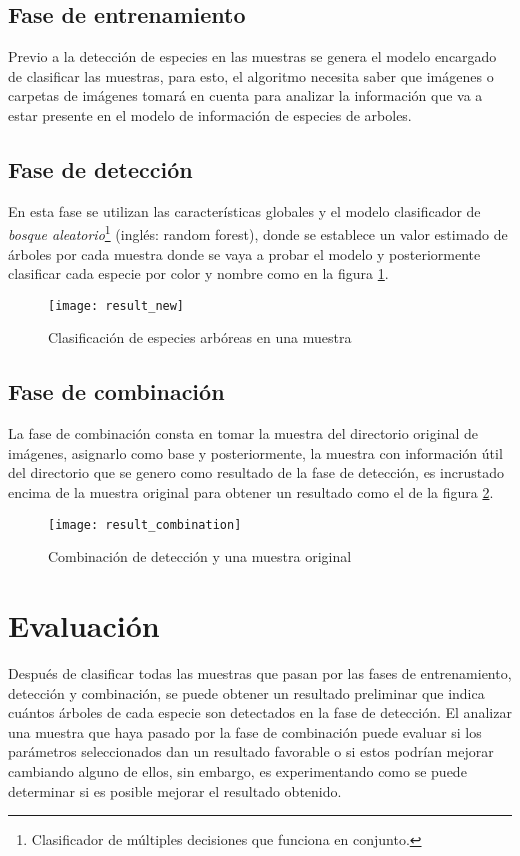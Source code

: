 \documentclass[review]{elsarticle}
\begin{document}
\subsection{Fase de entrenamiento}
Previo a la detección de especies en las muestras se genera el modelo encargado de clasificar las muestras, para esto, el algoritmo necesita saber que imágenes o carpetas de imágenes tomará en cuenta para analizar la información que va a estar presente en el modelo de información de especies de arboles. 

\subsection{Fase de detección}
En esta fase se utilizan las características globales y el modelo clasificador de {\em bosque aleatorio}\footnote{Clasificador de múltiples decisiones que funciona en conjunto.} (inglés: random forest), donde se establece un valor estimado de árboles por cada muestra donde se vaya a probar el modelo y posteriormente clasificar cada especie por color y nombre como en la figura \ref{Clasificación de especies arbóreas en una muestra}.
\\

\begin{figure}[H]
  \centering
         \texttt{[image: result\_new]}
    \caption{Clasificación de especies arbóreas en una muestra}
    \label{Clasificación de especies arbóreas en una muestra}
\end{figure}

\subsection{Fase de combinación}
La fase de combinación consta en tomar la muestra del directorio original de imágenes, asignarlo como base y posteriormente, la muestra con información útil del directorio que se genero como resultado de la fase de detección, es incrustado encima de la muestra original para obtener un resultado como el de la figura \ref{Combinación de detección y una muestra original}.


\begin{figure}[H]
  \centering
  \texttt{[image: result\_combination]}
    \caption{Combinación de detección y una muestra original}
    \label{Combinación de detección y una muestra original}
\end{figure}
\clearpage

\section{Evaluación}
Después de clasificar todas las muestras que pasan por las fases de entrenamiento, detección y combinación, se puede obtener un resultado preliminar que indica  cuántos árboles de cada especie son detectados en la fase de detección. El analizar una muestra que haya pasado por la fase de combinación puede evaluar si los parámetros seleccionados dan un resultado favorable o si estos podrían mejorar cambiando alguno de ellos, sin embargo, es experimentando como se puede determinar si es posible mejorar el resultado obtenido.\\
\end{document}
